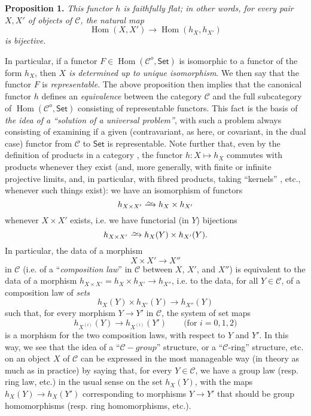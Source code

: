 \documentclass{article}
\newenvironment{itenv}[1]
  {\phantomsection\par\medskip\noindent\textbf{#1.}\itshape}
  {\medskip}
\renewcommand{\cal}[1]{{\mathcal{#1}}}
\newcommand{\simto}{\xrightarrow{\raisebox{-0.7ex}[0ex][0ex]{$\sim$}}}
\newcommand{\Set}{\mathsf{Set}}
\DeclareMathOperator{\Hom}{Hom}
\newcommand{\oldpage}[1]{\marginpar{\footnotesize$\Big\vert$ \textit{p.~#1}}}
\begin{document}
\begin{itenv}{Proposition 1}
\label{A.1-proposition1}
  This functor $h$ is \emph{faithfully flat};
  in other words, for every pair $X,X'$ of objects of $\cal{C}$, the natural map
  \[
    \Hom(X,X') \to \Hom(h_X,h_{X'})
  \]
  is \emph{bijective}.
\end{itenv}

In particular, if a functor $F\in\Hom(\cal{C}^o,\Set)$ is isomorphic to a functor of the form $h_X$, then \emph{$X$ is determined up to unique isomorphism}.
We then say that the functor $F$ is \emph{representable}.
The above proposition then implies that the canonical functor $h$ defines an \emph{equivalence} between the category $\cal{C}$ and the full subcategory of $\Hom(\cal{C}^o,\Set)$ consisting of representable functors.
This fact is the basis of \emph{the idea of a ``solution of a universal problem''}, with such a problem always consisting of examining if a given (contravariant, as here, or covariant, in the dual case) functor from $\cal{C}$ to $\Set$ is representable.
\oldpage{195-02}
Note further that, even by the definition of products in a category \cite{1}, the functor $h\colon X\mapsto h_X$ commutes with products whenever they exist (and, more generally, with finite or infinite projective limits, and, in particular, with fibred products, taking ``kernels'' \cite{2}, etc., whenever such things exist): we have an isomorphism of functors
\[
  h_{X\times X'} \simto h_X\times h_{X'}
\]
whenever $X\times X'$ exists, i.e. we have functorial (in $Y$) bijections
\[
  h_{X\times X'} \simto h_X(Y)\times h_{X'}(Y).
\]
In particular, the data of a morphism
\[
  X\times X' \to X''
\]
in $\cal{C}$ (i.e. of a ``\emph{composition law}'' in $\cal{C}$ between $X$, $X'$, and $X''$) is equivalent to the data of a morphism $h_{X\times X'}=h_X\times h_{X'}\to h_{X''}$, i.e. to the data, for all $Y\in\cal{C}$, of a composition law of \emph{sets}
\[
  h_X(Y)\times h_{X'}(Y) \to h_{X''}(Y)
\]
such that, for every morphism $Y\to Y'$ in $\cal{C}$, the system of set maps
\[
  h_{X^{(i)}}(Y) \to h_{X^{(i)}}(Y')
  \qquad\mbox{(for $i=0,1,2$)}
\]
is a morphism for the two composition laws, with respect to $Y$ and $Y'$.
In this way, we see that the idea of a ``$\cal{C}-group$'' structure, or a ``$\cal{C}$-ring'' structure, etc. on an object $X$ of $\cal{C}$ can be expressed in the most manageable way (in theory as much as in practice) by saying that, for every $Y\in\cal{C}$, we have a group law (resp. ring law, etc.) in the usual sense on the set $h_X(Y)$, with the maps $h_X(Y)\to h_X(Y')$ corresponding to morphisms $Y\to Y'$ that should be group homomorphisms (resp. ring homomorphisms, etc.).
\end{document}
